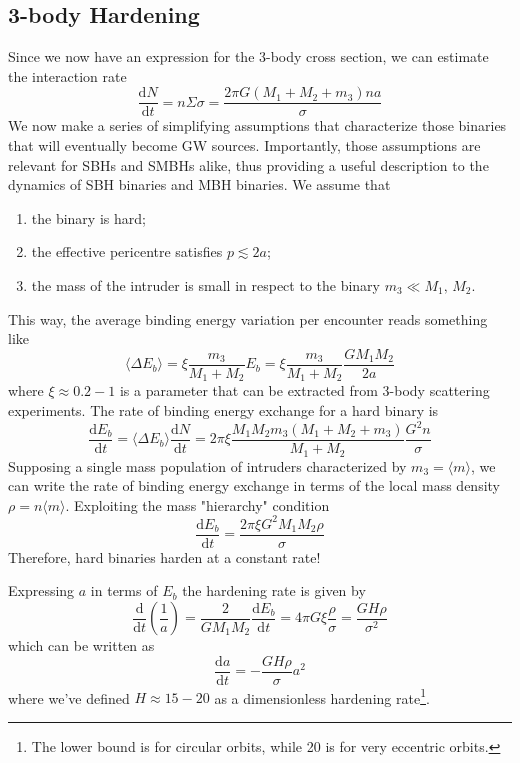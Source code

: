 \subsection{3-body Hardening}
Since we now have an expression for the 3-body cross section, we can estimate the interaction rate
\begin{equation*}
    \frac{\text{d}N}{\text{d}t} = n\Sigma\sigma = \frac{2\pi G(M_{1}+M_{2}+m_{3})na}{\sigma}
\end{equation*}
We now make a series of simplifying assumptions that characterize those binaries that will eventually become GW sources. Importantly, those assumptions are
relevant for SBHs and SMBHs alike, thus providing a useful description to the dynamics of SBH binaries and MBH binaries. We assume that
\begin{enumerate}
    \item the binary is hard;
    \item the effective pericentre satisfies $p \lesssim 2a$;
    \item the mass of the intruder is small in respect to the binary $m_{3}\ll M_{1},\,M_{2}$.
\end{enumerate}
This way, the average binding energy variation per encounter reads something like 
\begin{equation*}
    \langle \Delta E_{b} \rangle = \xi \frac{m_{3}}{M_{1}+M_{2}}E_{b} = \xi\frac{m_{3}}{M_{1}+M_{2}}\frac{GM_{1}M_{2}}{2a}
\end{equation*}
where $\xi \approx 0.2-1$ is a parameter that can be extracted from 3-body scattering experiments. The rate of binding energy exchange for a hard binary is
\begin{equation*}
    \frac{\text{d}E_{b}}{\text{d}t} = \langle \Delta E_{b} \rangle \frac{\text{d}N}{\text{d}t} = 2\pi\xi \frac{M_{1}M_{2}m_{3}(M_{1}+M_{2}+m_{3})}{M_{1}+M_{2}}\frac{G^{2}n}{\sigma}
\end{equation*}
Supposing a single mass population of intruders
characterized by $m_{3} = \langle m \rangle$, we can write the rate of binding energy exchange in terms of the local mass density $\rho = n\langle m \rangle$. Exploiting the mass "hierarchy" condition
\begin{equation*}
    \frac{\text{d}E_{b}}{\text{d}t} = \frac{2\pi\xi G^{2}M_{1}M_{2}\rho}{\sigma}
\end{equation*}
Therefore, hard binaries harden at a constant rate!
\par Expressing $a$ in terms of $E_{b}$ the hardening rate is given by 
\begin{equation*}
    \frac{\text{d}}{\text{d}t}\left(\frac{1}{a}\right) = \frac{2}{GM_{1}M_{2}}\frac{\text{d}E_{b}}{\text{d}t} = 4\pi G\xi\frac{\rho}{\sigma} = \frac{GH\rho}{\sigma^{2}}
\end{equation*}
which can be written as
\begin{equation}
      \frac{\text{d}a}{\text{d}t} = -\frac{GH\rho}{\sigma}a^{2}
      \label{eq:hardening_rate}
\end{equation}
where we've defined $H\approx 15-20$ as a dimensionless hardening rate\footnote{The lower bound is for circular orbits, while 20 is for very eccentric orbits.}.
